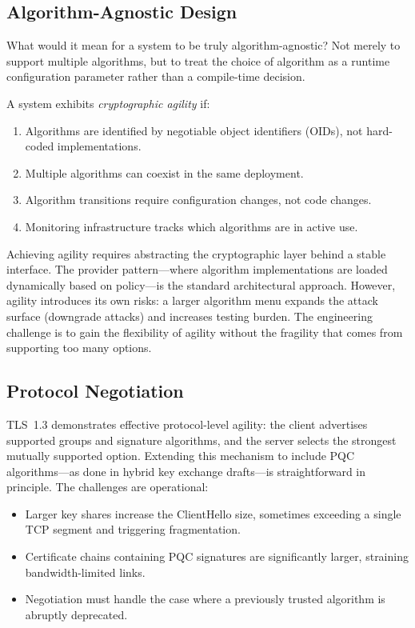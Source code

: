 \subsection{Algorithm-Agnostic Design}
\label{subsec:agnostic-design}

What would it mean for a system to be truly algorithm-agnostic?  Not merely to support multiple algorithms, but to treat the choice of algorithm as a runtime configuration parameter rather than a compile-time decision.

\begin{definition}
\label{def:crypto-agility}
A system exhibits \emph{cryptographic agility} if:
\begin{enumerate}
\item Algorithms are identified by negotiable object identifiers (OIDs), not hard-coded implementations.
\item Multiple algorithms can coexist in the same deployment.
\item Algorithm transitions require configuration changes, not code changes.
\item Monitoring infrastructure tracks which algorithms are in active use.
\end{enumerate}
\end{definition}

Achieving agility requires abstracting the cryptographic layer behind a stable interface.  The provider pattern---where algorithm implementations are loaded dynamically based on policy---is the standard architectural approach.  However, agility introduces its own risks: a larger algorithm menu expands the attack surface (downgrade attacks) and increases testing burden.  The engineering challenge is to gain the flexibility of agility without the fragility that comes from supporting too many options.

\subsection{Protocol Negotiation}
\label{subsec:protocol-negotiation}

TLS~1.3 demonstrates effective protocol-level agility: the client advertises supported groups and signature algorithms, and the server selects the strongest mutually supported option.  Extending this mechanism to include PQC algorithms---as done in hybrid key exchange drafts---is straightforward in principle.  The challenges are operational:
\begin{itemize}
\item Larger key shares increase the ClientHello size, sometimes exceeding a single TCP segment and triggering fragmentation.
\item Certificate chains containing PQC signatures are significantly larger, straining bandwidth-limited links.
\item Negotiation must handle the case where a previously trusted algorithm is abruptly deprecated.
\end{itemize}

